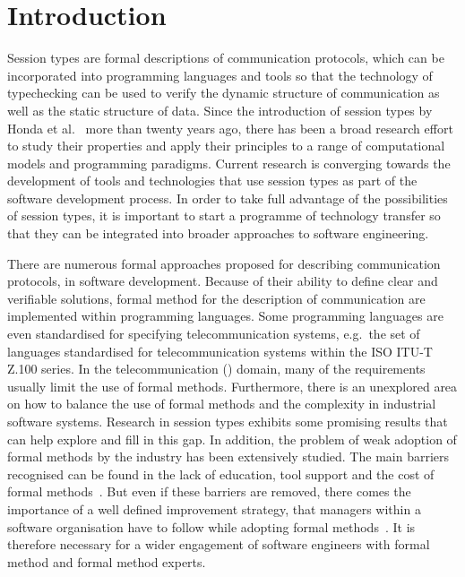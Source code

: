 
\section{Introduction}

Session types are formal descriptions of communication protocols,
which can be incorporated into programming languages and tools so
that the technology of typechecking can be used to verify the dynamic
structure of communication as well as the static structure of data.
Since the introduction of session types by Honda et al.\
\cite{honda.vasconcelos.kubo:language-primitives}
more than twenty years ago, there has been a broad research effort to study
their properties and apply their principles to a range of computational models
and programming paradigms.
Current research is converging towards the development of tools and technologies
that use session types as part of the software development process.
In order to take full advantage of the possibilities of session types,
it is important to start a programme of technology transfer so that they can
be integrated into broader approaches to software engineering.

There are numerous formal approaches proposed for describing communication protocols,
in software development.
Because of their ability to define clear and verifiable solutions, formal
method for the description of communication are implemented within programming languages.
Some programming languages are even standardised for specifying telecommunication systems,
e.g.~the set of languages standardised for telecommunication systems within the
ISO ITU-T Z.100 series.
In the telecommunication () domain, many of the requirements
usually limit the use of formal methods.
Furthermore, there is an unexplored area on how to balance the use of formal methods
and the complexity in industrial software systems.
Research in session types exhibits some promising results that can
help explore and fill in this gap.
In addition, the problem of weak adoption of formal methods
by the industry has been extensively studied.
The main barriers recognised can be found in the lack
of education, tool support and the cost of formal methods~\cite{Davis2013}.
But even if these barriers are removed, there comes the importance of a 
well defined improvement strategy, that managers within a software
organisation have to follow while adopting formal methods~\cite{Ponsard2013}.
It is therefore necessary for a wider engagement of software engineers 
with formal method and formal method experts.


